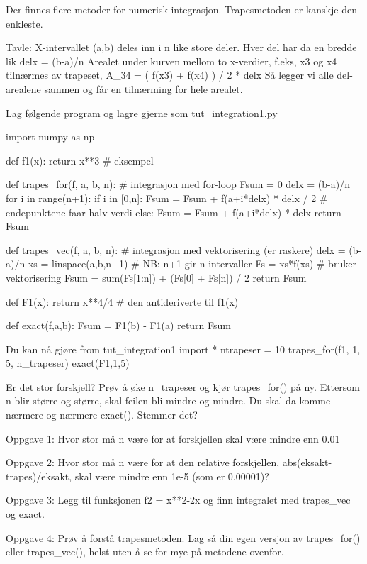 \documentclass[a4paper,11pt,utf8]{book}
\begin{document}
Der finnes flere metoder for numerisk integrasjon. 
Trapesmetoden er kanskje den enkleste. 

Tavle: 
X-intervallet (a,b) deles inn i n like store deler.
Hver del har da en bredde lik delx = (b-a)/n
Arealet under kurven mellom to x-verdier, f.eks, x3 og x4 tilnærmes av trapeset,
A_34 = ( f(x3) + f(x4) ) / 2 * delx
Så legger vi alle del-arealene sammen og får en tilnærming for hele arealet. 

Lag følgende program og lagre gjerne som tut_integration1.py 

import numpy as np

def f1(x):
    return x**3   # eksempel


def trapes_for(f, a, b, n):  # integrasjon med for-loop
    Fsum = 0
    delx = (b-a)/n
    for i in range(n+1):
        if i in [0,n]:
           Fsum = Fsum + f(a+i*delx) * delx / 2  # endepunktene faar halv verdi
        else: 
           Fsum = Fsum + f(a+i*delx) * delx
    return Fsum


def trapes_vec(f, a, b, n):  # integrasjon med vektorisering (er raskere)
    delx = (b-a)/n
    xs = linspace(a,b,n+1)   # NB: n+1 gir n intervaller
    Fs = xs*f(xs)   # bruker vektorisering
    Fsum = sum(Fs[1:n]) + (Fs[0] + Fs[n]) / 2
    return Fsum 


def F1(x):    
    return x**4/4    # den antideriverte til f1(x)

def exact(f,a,b):
    Fsum = F1(b) - F1(a)
    return Fsum



Du kan nå gjøre
from tut_integration1 import *
ntrapeser = 10
trapes_for(f1, 1, 5, n_trapeser)
exact(F1,1,5)

Er det stor forskjell?
Prøv å øke n_trapeser og kjør trapes_for() på ny. 
Ettersom n blir større og større, skal feilen bli mindre og mindre. 
Du skal da komme nærmere og nærmere exact(). 
Stemmer det? 



Oppgave 1: Hvor stor må n være for at forskjellen skal være mindre enn 0.01


Oppgave 2: Hvor stor må n være for at den relative forskjellen, abs(eksakt-trapes)/eksakt, skal være mindre enn 1e-5 (som er 0.00001)? 


Oppgave 3: Legg til funksjonen f2 = x**2-2x og finn integralet med trapes_vec og exact. 


Oppgave 4: Prøv å forstå trapesmetoden. Lag så din egen versjon av trapes_for() eller trapes_vec(), 
helst uten å se for mye på metodene ovenfor. 
\end{document}
